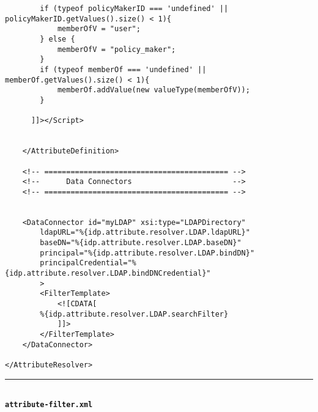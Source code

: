 \begin{verbatim}
        if (typeof policyMakerID === 'undefined' || policyMakerID.getValues().size() < 1){
            memberOfV = "user";
        } else {
            memberOfV = "policy_maker";
        }
		if (typeof memberOf === 'undefined' || memberOf.getValues().size() < 1){
			memberOf.addValue(new valueType(memberOfV));
		}	
        
      ]]></Script>
    	
	
	</AttributeDefinition>

    <!-- ========================================== -->
    <!--      Data Connectors                       -->
    <!-- ========================================== -->


	<DataConnector id="myLDAP" xsi:type="LDAPDirectory"
        ldapURL="%{idp.attribute.resolver.LDAP.ldapURL}"
        baseDN="%{idp.attribute.resolver.LDAP.baseDN}"
        principal="%{idp.attribute.resolver.LDAP.bindDN}"
        principalCredential="%{idp.attribute.resolver.LDAP.bindDNCredential}"
		>
        <FilterTemplate>
            <![CDATA[
        %{idp.attribute.resolver.LDAP.searchFilter}
            ]]>
        </FilterTemplate>
    </DataConnector>

</AttributeResolver>

\end{verbatim}
\noindent\rule{14cm}{0.4pt}\\
\textbf{\texttt{attribute-filter.xml}}
